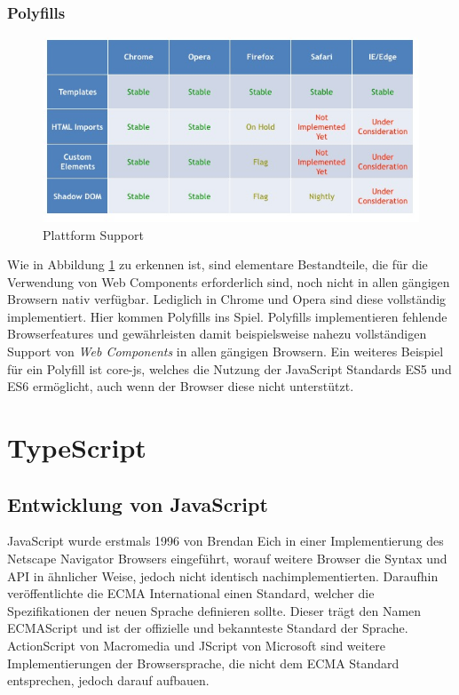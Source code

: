 \subsubsection{Polyfills}
\begin{figure}[htp]
 \centering
 \includegraphics[width=0.7\linewidth]{kapitel2/platform_support.jpg}
 \caption{Plattform Support \cite{WebCo43:online}}
 \label{fig:platform_support}
\end{figure}

\noindent Wie in Abbildung \ref{fig:platform_support} zu erkennen ist, sind elementare Bestandteile, die für die Verwendung von Web Components erforderlich sind, noch nicht in
allen gängigen Browsern nativ verfügbar. Lediglich in Chrome und Opera sind diese vollständig implementiert.
Hier kommen Polyfills ins Spiel. Polyfills implementieren fehlende Browserfeatures und gewährleisten damit beispielsweise nahezu vollständigen
Support von \emph{Web Components} in allen gängigen Browsern. Ein weiteres Beispiel für ein Polyfill ist core-js,
welches die Nutzung der JavaScript Standards \ac{ES5} und \ac{ES6} ermöglicht, auch wenn der Browser diese nicht unterstützt.



\section{TypeScript}

\subsection{Entwicklung von JavaScript}


JavaScript wurde erstmals 1996 von Brendan Eich in einer Implementierung des Netscape Navigator Browsers eingeführt,
worauf weitere Browser die Syntax und API in ähnlicher Weise, jedoch nicht identisch nachimplementierten.
Daraufhin veröffentlichte die ECMA International einen Standard, welcher die Spezifikationen der neuen Sprache
definieren sollte. Dieser trägt den Namen ECMAScript und ist der offizielle und bekannteste Standard der
Sprache. ActionScript von Macromedia und JScript von Microsoft sind weitere Implementierungen der Browsersprache,
die nicht dem ECMA Standard entsprechen, jedoch darauf aufbauen.

